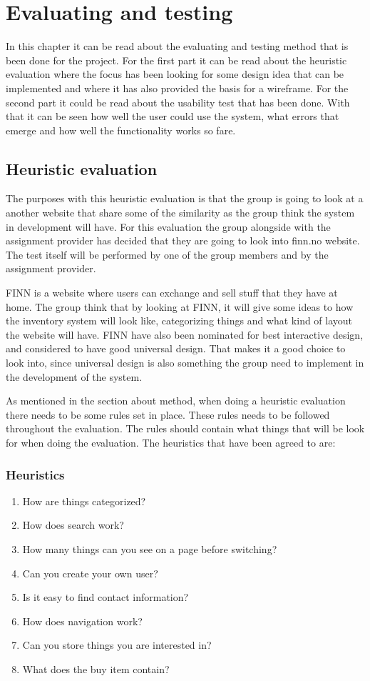 \chapter{Evaluating and testing}
In this chapter it can be read about the evaluating and testing method that is been done for the project. For the first part it can be read about the heuristic evaluation where the focus has been looking for some design idea that can be implemented and where it has also provided the basis for a wireframe. For the second part it could be read about the usability test that has been done. With that it can be seen how well the user could use the system, what errors that emerge and how well the functionality works so fare. 

\section{Heuristic evaluation}
The purposes with this heuristic evaluation is that the group is going to look at a another website that share some of the similarity as the group think the system in development will have. For this evaluation the group alongside with the assignment provider has decided that they are going to look into finn.no website. The test itself will be performed by one of the group members and by the assignment provider.

FINN is a website where users can exchange and sell stuff that they have at home. The group think that by looking at FINN, it will give some ideas to how the inventory system will look like, categorizing things and what kind of layout the website will have. FINN have also been nominated for best interactive design,
and considered to have good universal design.\cite{finn_nominert}
That makes it a good choice to look into, since universal design is also something the group need to implement in the development of the system. 

As mentioned in the section about method, when doing a heuristic evaluation there needs to be some rules set in place. These rules needs to be followed throughout the evaluation. The rules should contain what things that will be look for when doing the evaluation. The heuristics that have been agreed to are:

\subsection{Heuristics}
\begin{enumerate}
  \item How are things categorized?
  \item How does search work?
  \item How many things can you see on a page before switching? 
  \item Can you create your own user?
  \item Is it easy to find contact information?
  \item How does navigation work?
  \item Can you store things you are interested in?
  \item What does the buy item contain?
 \end{enumerate}

